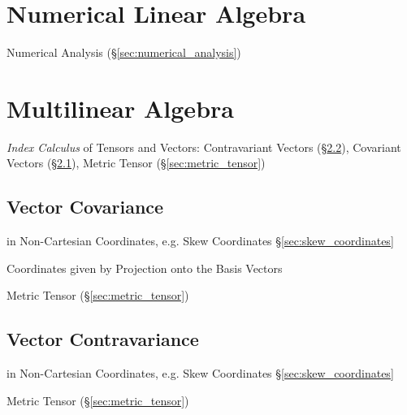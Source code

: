 \section{Numerical Linear Algebra}\label{sec:numerical_linear_algebra}

\fist Numerical Analysis (\S\ref{sec:numerical_analysis})



\section{Multilinear Algebra}\label{sec:multilinear_algebra}

\emph{Index Calculus} of Tensors and Vectors: Contravariant Vectors
(\S\ref{sec:vector_contravariance}), Covariant Vectors
(\S\ref{sec:vector_covariance}), Metric Tensor (\S\ref{sec:metric_tensor})



\subsection{Vector Covariance}\label{sec:vector_covariance}

in Non-Cartesian Coordinates, e.g. Skew Coordinates \S\ref{sec:skew_coordinates}

Coordinates given by Projection onto the Basis Vectors

Metric Tensor (\S\ref{sec:metric_tensor})



\subsection{Vector Contravariance}\label{sec:vector_contravariance}

in Non-Cartesian Coordinates, e.g. Skew Coordinates \S\ref{sec:skew_coordinates}

Metric Tensor (\S\ref{sec:metric_tensor})



